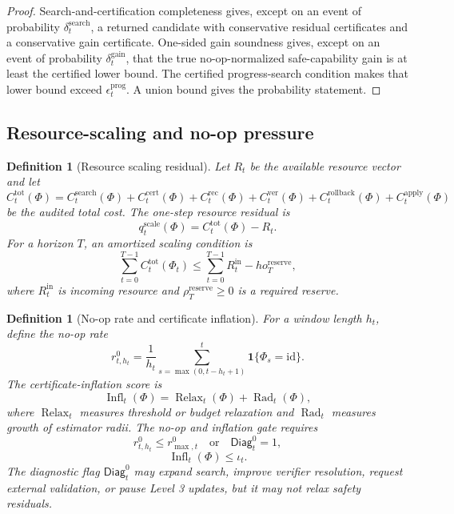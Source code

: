 \documentclass[11pt]{article}
\newtheorem{definition}[theorem]{Definition}
\newcommand{\id}{\mathrm{id}}
\newcommand{\1}{\mathbf{1}}
\begin{document}
\begin{proof}
Search-and-certification completeness gives, except on an event of probability \(\delta_t^{\mathrm{search}}\), a returned candidate with conservative residual certificates and a conservative gain certificate.  One-sided gain soundness gives, except on an event of probability \(\delta_t^{\mathrm{gain}}\), that the true no-op-normalized safe-capability gain is at least the certified lower bound.  The certified progress-search condition makes that lower bound exceed \(\epsilon_t^{\mathrm{prog}}\).  A union bound gives the probability statement.
\end{proof}

\subsection{Resource-scaling and no-op pressure}

\begin{definition}[Resource scaling residual]
\label{def:resource_scaling_residual_operational}
Let \(R_t\) be the available resource vector and let
\[
C_t^{\mathrm{tot}}(\Phi)
=
C_t^{\mathrm{search}}(\Phi)+C_t^{\mathrm{cert}}(\Phi)+C_t^{\mathrm{rec}}(\Phi)+C_t^{\mathrm{ver}}(\Phi)+C_t^{\mathrm{rollback}}(\Phi)+C_t^{\mathrm{apply}}(\Phi)
\]
be the audited total cost.  The one-step resource residual is
\[
q_t^{\mathrm{scale}}(\Phi)=C_t^{\mathrm{tot}}(\Phi)-R_t.
\]
For a horizon \(T\), an amortized scaling condition is
\[
\sum_{t=0}^{T-1}C_t^{\mathrm{tot}}(\Phi_t)
\le
\sum_{t=0}^{T-1}R_t^{\mathrm{in}}-
ho_T^{\mathrm{reserve}},
\]
where \(R_t^{\mathrm{in}}\) is incoming resource and \(\rho_T^{\mathrm{reserve}}\ge0\) is a required reserve.
\end{definition}

\begin{definition}[No-op rate and certificate inflation]
\label{def:noop_rate_certificate_inflation_operational}
For a window length \(h_t\), define the no-op rate
\[
r_{t,h_t}^{0}
=
\frac1{h_t}\sum_{s=\max(0,t-h_t+1)}^{t}\1\{\Phi_s=\id\}.
\]
The certificate-inflation score is
\[
\operatorname{Infl}_t(\Phi)
=
\operatorname{Relax}_t(\Phi)+\operatorname{Rad}_t(\Phi),
\]
where \(\operatorname{Relax}_t\) measures threshold or budget relaxation and \(\operatorname{Rad}_t\) measures growth of estimator radii.  The no-op and inflation gate requires
\[
r_{t,h_t}^{0}\le r_{\max,t}^{0}
\quad\text{or}
\quad
\mathsf{Diag}_t^{0}=1,
\]
\[
\operatorname{Infl}_t(\Phi)\le \iota_t.
\]
The diagnostic flag \(\mathsf{Diag}_t^{0}\) may expand search, improve verifier resolution, request external validation, or pause Level 3 updates, but it may not relax safety residuals.
\end{definition}
\end{document}
